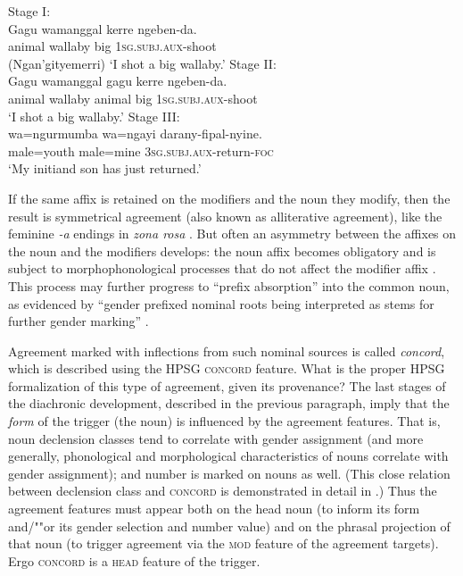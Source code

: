 \documentclass[output=paper
 	        ,biblatex
                ,babelshorthands
                ,newtxmath
                ,draftmode
                ,colorlinks, citecolor=brown
]{langscibook}
\begin{document}
\begin{exe}
\ex
\begin{xlist}
\ex \label{wallaby1} Stage I: \\
\gll Gagu   wamanggal kerre ngeben-da. \\
     animal wallaby   big   1\textsc{sg.subj.aux}-shoot \\\hfill(Ngan’gityemerri)
\glt `I shot a big wallaby.’	
\ex \label{wallaby2} Stage II: \\
\gll 	Gagu	   wamanggal	   gagu	kerre	    ngeben-da. \\
	animal	wallaby	  animal     	big	1\textsc{sg.subj.aux}-shoot\\
\glt `I shot a big wallaby.’
\ex \label{wallaby3} Stage III: \\
\gll 	wa=ngurmumba	wa=ngayi	darany-fipal-nyine. \\
	male=youth	male=mine	\textsc{3sg.subj.aux}-return-\textsc{foc} \\
\glt 	`My initiand son has just returned.’ 
\end{xlist}
\end{exe}

\noindent
If the same affix is retained on the modifiers and the noun they modify, then the result is symmetrical agreement (also known as alliterative agreement), like the feminine \textit{-a} endings in  \textit{zona rosa} \citep[87--88]{corbett:2006}.  But often an asymmetry between the affixes on the  noun and the modifiers develops: the noun affix becomes obligatory and is subject to morphophonological processes that do not affect the modifier affix \citep[216]{reid:1997}.    This process may further progress to ``prefix absorption'' into the common noun, as evidenced by ``gender prefixed nominal roots being interpreted as stems for further gender marking'' \citep[217]{reid:1997}.


Agreement marked with inflections from such nominal sources is called \emph{concord}, which is described using the HPSG \textsc{concord} feature.  What is the proper HPSG formalization of this type of agreement, given its provenance?   The last stages of the diachronic development, described in the previous paragraph, imply that the \textit{form} of the trigger (the noun) is influenced by the agreement features.  That is, noun declension classes tend to correlate with gender assignment (and more generally, phonological and morphological characteristics of nouns correlate with gender assignment); and number is marked on nouns as well.  (This close relation between declension class and \textsc{concord} is demonstrated in detail in \citealt[Chapter~2]{Wechsler+Zlatic:2003}.) Thus the agreement features must appear both on the head noun (to inform its form and/""or its gender selection and number value) and on the phrasal projection of that noun (to trigger agreement via the \textsc{mod} feature of the agreement targets).  Ergo \textsc{concord} is a \textsc{head} feature of the trigger.  
\end{document}
